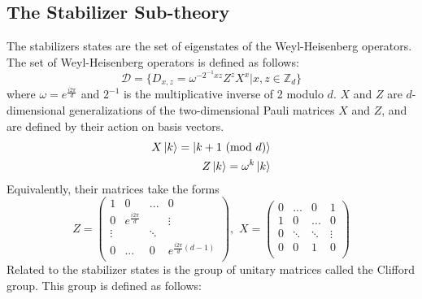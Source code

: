 \documentclass[../3Wworkreport.tex]{subfiles}
\begin{document}
\nocite{Nielsen2010, gottesman2013, Wolf2012}

\newpage
{}
{}
\printbibliography[title=References]
\newpage


\begin{appendices}

\chapter{The Stabilizer Sub-theory}
\label{app:stabilizer}

The stabilizers states are the set of eigenstates of the Weyl-Heisenberg operators. The set of Weyl-Heisenberg operators is defined as follows:
\begin{equation}
	\mathcal{D} = \{D_{x,z} = \omega^{-2^{-1}xz}Z^zX^x | x,z \in \mathbb{Z}_d\}
\end{equation}
where $\omega = e^{\frac{i2\pi}{d}}$ and $2^{-1}$ is the multiplicative inverse of 2 modulo $d$. $X$ and $Z$ are $d$-dimensional generalizations of the two-dimensional Pauli matrices $X$ and $Z$, and are defined by their action on basis vectors.
\begin{alignat}{1}
	X\ket{k} = \ket{k + 1 \text{ (mod }d)}\\
	Z\ket{k} = \omega^k\ket{k}
\end{alignat}
Equivalently, their matrices take the forms
\begin{equation}
Z = \left( \begin{array}{cccc}
	1 & 0 & ... & 0\\
	0 & e^{\frac{i2\pi}{d}} &  & \vdots\\
	\vdots & & \ddots & \\
	0 & ... & 0 & e^{\frac{i2\pi}{d}(d-1)}\\
	\end{array} \right), \,\,
X = \left( \begin{array}{cccc}
	0 & ... & 0 & 1\\
	1 & 0 & ... & 0\\
	0 & \ddots & \ddots & \vdots\\
	0 & 0 & 1 & 0\\
	\end{array} \right)
\end{equation}
Related to the stabilizer states is the group of unitary matrices called the Clifford group. This group is defined as follows:

\end{appendices}
\end{document}
